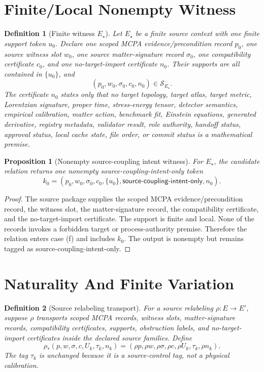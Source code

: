 \documentclass[11pt]{article}
\newtheorem{definition}{Definition}
\newtheorem{proposition}{Proposition}
\begin{document}
\section{Finite/Local Nonempty Witness}

\begin{definition}[Finite witness \(E_\star\)]
Let \(E_\star\) be a finite source context with one finite support token
\(u_0\). Declare one scoped MCPA evidence/precondition record \(p_0\), one
source witness slot \(w_0\), one source matter-signature record
\(\sigma_0\), one compatibility certificate \(c_0\), and one no-target-import
certificate \(n_0\). Their supports are all contained in \(\{u_0\}\), and
\[
  (p_0,w_0,\sigma_0,c_0,n_0)\in\mathcal{S}_{E_\star}.
\]
The certificate \(n_0\) states only that no target topology, target atlas,
target metric, Lorentzian signature, proper time, stress-energy tensor,
detector semantics, empirical calibration, matter action, benchmark fit,
Einstein equations, generated derivative, registry metadata, validator
result, role authority, handoff status, approval status, local cache state,
file order, or commit status is a mathematical premise.
\end{definition}

\begin{proposition}[Nonempty source-coupling intent witness]
For \(E_\star\), the candidate relation returns one nonempty
source-coupling-intent-only token
\[
  k_0=(p_0,w_0,\sigma_0,c_0,\{u_0\},
  \mathsf{source\text{-}coupling\text{-}intent\text{-}only},n_0).
\]
\end{proposition}

\begin{proof}
The source package supplies the scoped MCPA evidence/precondition record,
the witness slot, the matter-signature record, the compatibility certificate,
and the no-target-import certificate. The support is finite and local. None
of the records invokes a forbidden target or process-authority premise.
Therefore the relation enters case (f) and includes \(k_0\). The output is
nonempty but remains tagged as source-coupling-intent-only.
\end{proof}

\section{Naturality And Finite Variation}

\begin{definition}[Source relabeling transport]
For a source relabeling \(\rho:E\to E'\), suppose \(\rho\) transports scoped
MCPA records, witness slots, matter-signature records, compatibility
certificates, supports, obstruction labels, and no-target-import certificates
inside the declared source families. Define
\[
  \rho_*(p,w,\sigma,c,U_k,\tau_k,n_k)
  =
  (\rho p,\rho w,\rho\sigma,\rho c,\rho U_k,\tau_k,\rho n_k).
\]
The tag \(\tau_k\) is unchanged because it is a source-control tag, not a
physical calibration.
\end{definition}
\end{document}
